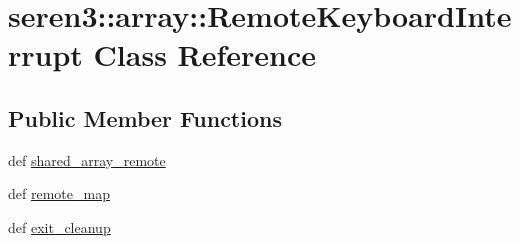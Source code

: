 \hypertarget{classseren3_1_1array_1_1RemoteKeyboardInterrupt}{
\section{seren3::array::RemoteKeyboardInterrupt Class Reference}
\label{classseren3_1_1array_1_1RemoteKeyboardInterrupt}
}
\subsection*{Public Member Functions}
\begin{DoxyCompactItemize}
\item 
def \hyperlink{classseren3_1_1array_1_1RemoteKeyboardInterrupt_a465c9a54d5b8b38699014c9d4dca8b35}{shared\_\-array\_\-remote}
\item 
def \hyperlink{classseren3_1_1array_1_1RemoteKeyboardInterrupt_aff7e4bd891bea9300aa525620a14e490}{remote\_\-map}
\item 
def \hyperlink{classseren3_1_1array_1_1RemoteKeyboardInterrupt_a07c542d0d324f612b172cee29290c4f3}{exit\_\-cleanup}
\end{DoxyCompactItemize}


